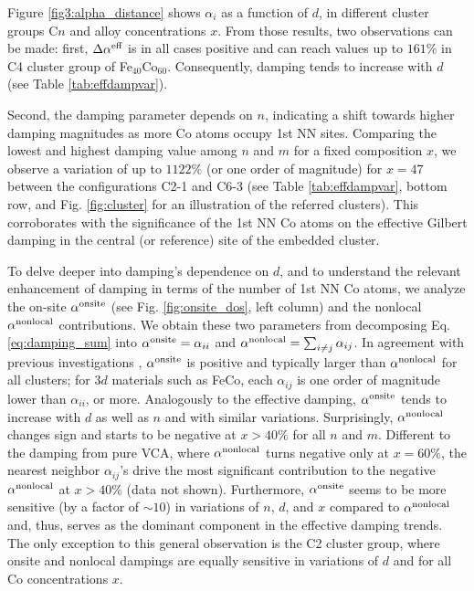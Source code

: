 Figure \ref{fig3:alpha_distance} shows $\alpha_i$ as a function of $d$, in different cluster groups C$n$ and alloy concentrations $x$. From those results, two observations can be made: first, $\Delta\alpha^{\textnormal{eff}}$ is in all cases positive and can reach values up to $161\%$ in C4 cluster group of Fe$_{40}$Co$_{60}$. Consequently, damping tends to increase with $d$ (see Table \ref{tab:effdampvar}).  

Second, the damping parameter depends on $n$, indicating a shift towards higher damping magnitudes as more Co atoms occupy 1st NN sites. Comparing the lowest and highest damping value among $n$ and $m$ for a fixed composition $x$, we observe a variation of up to $1122\%$ (or one order of magnitude) for $x=47$ between the configurations C2-1 and C6-3 (see Table \ref{tab:effdampvar}, bottom row, and Fig. \ref{fig:cluster} for an illustration of the referred clusters). This corroborates with the significance of the 1st NN Co atoms on the effective Gilbert damping in the central (or reference) site of the embedded cluster.


To delve deeper into damping's dependence on $d$, and to understand the relevant enhancement of damping in terms of the number of 1st NN Co atoms, we analyze the on-site $\alpha^{\textnormal{onsite}}$ (see Fig. \ref{fig:onsite_dos}, left column) and the nonlocal $\alpha^{\textnormal{nonlocal}}$ contributions. We obtain these two parameters from decomposing Eq. \ref{eq:damping_sum} into  $\alpha^{\textnormal{onsite}}=\alpha_{ii}$ and $\alpha^{\textnormal{nonlocal}}=\sum_{i\neq j}\alpha_{ij}$. In agreement with previous investigations \cite{PhysRevB.103.L220405, PhysRevMaterials.2.013801,PhysRevB.108.014433}, $\alpha^{\textnormal{onsite}}$ is positive and typically larger than $\alpha^{\textnormal{nonlocal}}$ for all clusters; for $3d$ materials such as FeCo, each $\alpha_{ij}$ is one order of magnitude lower than $\alpha_{ii}$, or more. Analogously to the effective damping, $\alpha^{\textnormal{onsite}}$ tends to increase with $d$ as well as $n$ and with similar variations. Surprisingly, $\alpha^{\textnormal{nonlocal}}$ changes sign and starts to be negative at $x>40\%$ for all $n$ and $m$. Different to the damping from pure VCA, where $\alpha^{\textnormal{nonlocal}}$ turns negative only at $x=60\%$, the nearest neighbor $\alpha_{ij}$'s drive the most significant contribution to the negative $\alpha^{\textnormal{nonlocal}}$ at $x>40\%$ (data not shown). Furthermore, $\alpha^{\textnormal{onsite}}$ seems to be more sensitive (by a factor of $\sim10$) in variations of $n$, $d$, and $x$ compared to $\alpha^{\textnormal{nonlocal}}$ and, thus, serves as the dominant component in the effective damping trends. The only exception to this general observation is the C2 cluster group, where onsite and nonlocal dampings are equally sensitive in variations of $d$ and for all Co concentrations $x$.
 

